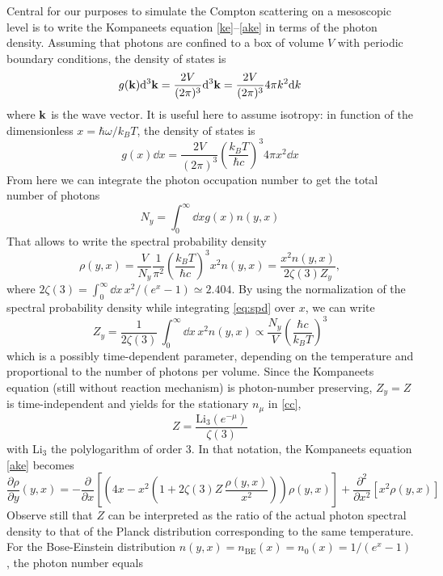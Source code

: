 \documentclass[a4paper,12pt,reqno,superscriptaddress,nofootinbib]{revtex4}
\newcommand{\0}{^{(0)}}
\newcommand{\1}{^{(1)}}
\newcommand{\2}{^{(2)}}
\begin{document}
Central for our purposes to simulate the Compton scattering on a mesoscopic level is to write the Kompaneets equation \eqref{ke}--\eqref{ake} in terms of the photon density. 
Assuming that photons are confined to a box of volume $V$ with periodic boundary conditions, the density of states is
\[
g(\vb{k}) \dd^3 \vb{k} = \frac{2V}{(2\pi)^3} \dd^3 \vb{k} = \frac{2V}{(2\pi)^3} 
4\pi k^2 \dd k
\]
where $\vb{k}$ is the wave vector.  It is useful here to 
assume isotropy: in function of the dimensionless $x = \hbar \omega / k_B T$, the density of states is
\[
g(x) \dd x = \frac{2V}{(2\pi)^3} \left( \frac{k_B T}{\hbar c} \right)^3 4\pi 
x^2 \dd x
\] 
From here we can integrate the photon occupation number to get the total number of photons
\[ N_y = \int_0^\infty \dd{x} g(x) n(y,x)
 \]
That allows to write the spectral probability density
\begin{equation}\label{eq:spd}
\rho(y,x) = \frac{V}{N_y} \frac{1}{\pi^2} \left(\frac{k_B T}{\hbar c}\right)^3 
x^2 n(y,x) = \frac{x^2 n(y,x)}{2\zeta(3) Z_y},
\end{equation}
where $2\zeta(3) = \int_0^\infty \dd x \, x^2/(e^x-1) \simeq 2.404$.
By using the normalization of the spectral probability density while integrating \eqref{eq:spd} over $x$, we can write
\begin{equation}\label{zy}
Z_y =  \frac 1{2\zeta(3)}\,\int_0^\infty \dd x\, x^2 n(y,x) \propto  \frac{N_y}{V} \left(\frac{\hbar c}{k_B T}\right)^3
\end{equation}
which is a possibly time-dependent parameter, depending on the temperature and 
proportional to the number of photons per volume. Since the Kompaneets equation (still without reaction mechanism)
is photon-number preserving, $Z_y=Z$ is time-independent and yields for the 
stationary $n_\mu$ in \eqref{cc},
\[
Z = \frac{\text{Li}_3 (e^{-\mu})}{\zeta(3)}
\]
with Li$_3$ the polylogarithm of order 3.
In that notation, the Kompaneets equation \eqref{ake} becomes
\begin{equation}\label{kp}
\frac{\partial \rho}{\partial y} (y,x) = -\frac{\partial}{\partial x}\left[\left(4x- x^2\left(1+2\zeta(3) Z\,\frac{\rho(y,x)}{x^2}\right)\right)\rho(y,x)\right] + \frac{\partial^2}{\partial x^2}\left[x^2 \rho(y,x)\right]
\end{equation}
Observe still that  $Z$
can be interpreted as the ratio of the actual photon spectral density to that 
of the Planck distribution corresponding to the same temperature.  For the 
Bose-Einstein distribution $n(y,x)= n_\text{BE}(x) = n_0(x) = 1 / (e^x - 1)$, 
the photon number equals
\end{document}

